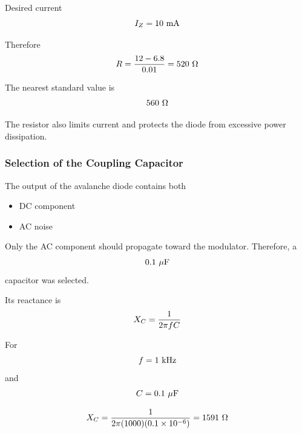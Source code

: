 \documentclass[12pt,a4paper]{report}
\begin{document}
	Desired current
	\begingroup
	\setlength{\mathindent}{0pt}
	\begin{equation*}
		\hfill
		I_Z = 10\ \text{mA}
		\hfill
	\end{equation*}
	\endgroup
	
	Therefore
	\begingroup
	\setlength{\mathindent}{0pt}
	\begin{equation*}
		\hfill
		R = \frac{12 - 6.8}{0.01} = 520\ \Omega
		\hfill
	\end{equation*}
	\endgroup
	
	The nearest standard value is
	\begingroup
	\setlength{\mathindent}{0pt}
	\begin{equation*}
		\hfill
		560\ \Omega
		\hfill
	\end{equation*}
	\endgroup
	
	The resistor also limits current and protects the diode from excessive power dissipation.
	
	\subsubsection{Selection of the Coupling Capacitor}
	
	The output of the avalanche diode contains both
	\begin{itemize}
		\item DC component
		\item AC noise
	\end{itemize}
	Only the AC component should propagate toward the modulator. Therefore, a
	\begingroup
	\setlength{\mathindent}{0pt}
	\begin{equation*}
		\hfill
		0.1\ \mu\text{F}
		\hfill
	\end{equation*}
	\endgroup
	capacitor was selected.
	
	Its reactance is
	\begingroup
	\setlength{\mathindent}{0pt}
	\begin{equation*}
		\hfill
		X_C = \frac{1}{2\pi fC}
		\hfill
	\end{equation*}
	\endgroup
	
	For
	\begingroup
	\setlength{\mathindent}{0pt}
	\begin{equation*}
		\hfill
		f = 1\ \text{kHz}
		\hfill
	\end{equation*}
	\endgroup
	and
	\begingroup
	\setlength{\mathindent}{0pt}
	\begin{equation*}
		\hfill
		C = 0.1\ \mu\text{F}
		\hfill
	\end{equation*}
	\endgroup
	
	\begingroup
	\setlength{\mathindent}{0pt}
	\begin{equation*}
		\hfill
		X_C = \frac{1}{2\pi(1000)(0.1 \times 10^{-6})} = 1591\ \Omega
		\hfill
	\end{equation*}
	\endgroup
	
\end{document}
